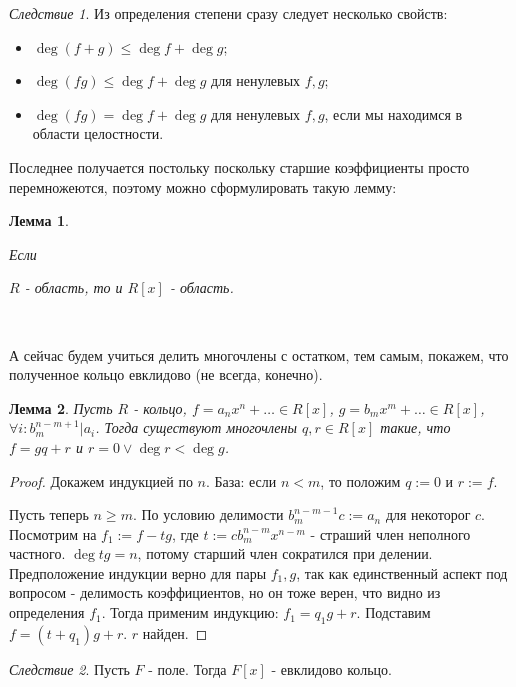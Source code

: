 \documentclass[a4paper,100pt]{article}
\theoremstyle{indented}
\newtheorem{lemma}{Лемма}
\theoremstyle{definition}
\theoremstyle{remark}
\newtheorem{cons}{Следствие}
\begin{document}
\begin{cons}
    Из определения степени сразу следует несколько свойств: \

    \begin{itemize}
        \item $\deg(f+g)\leq\deg f+\deg g$;
        \item $\deg(fg)\leq\deg f+\deg g$ для ненулевых $f, g$;
        \item $\deg(fg)=\deg f+\deg g$ для ненулевых $f, g$, если мы находимся в области целостности.
    \end{itemize}
\end{cons}

Последнее получается постольку поскольку старшие коэффициенты просто перемножеются, поэтому можно сформулировать такую лемму:\\

\begin{lemma}
    \hypertarget{t3}{Если} $R$ - область, то и $R[x]$ - область.
\end{lemma}\

А сейчас будем учиться делить многочлены с остатком, тем самым, покажем, что полученное кольцо евклидово (не всегда, конечно).\\

\begin{lemma}
    Пусть $R$ - кольцо, $f=a_nx^n+\dots \in R[x]$, $g=b_mx^m+\dots\in R[x]$, $\forall i: b_m^{n-m+1}\vert a_i$. Тогда существуют многочлены $q,r\in R[x]$ такие, что $f=gq+r$ и $r=0\vee \deg r<\deg g$.
\end{lemma}

\begin{proof}
    Докажем индукцией по $n$. База: если  $n<m$, то положим $q:=0$ и $r:=f$.\ 

    Пусть теперь $n\geq m$. По условию делимости $b_m^{n-m-1}c:=a_n$ для некоторог $c$. Посмотрим на $f_1:=f-tg$, где $t:=cb_m^{n-m}x^{n-m}$ - страший член неполного частного. $\deg tg = n$, потому старший член сократился при делении. Предположение индукции верно для пары $f_1,g$, так как единственный аспект под вопросом - делимость коэффициентов, но он тоже верен, что видно из определения $f_1$. Тогда применим индукцию: $f_1=q_1g+r$. Подставим $f=(t+q_1)g+r$. $r$ найден.
\end{proof}

\begin{cons}
    Пусть $F$ - поле. Тогда $F[x]$ - евклидово кольцо.
\end{cons}
\end{document}
